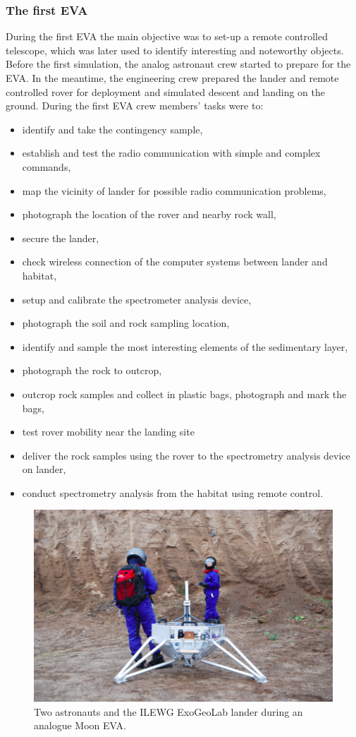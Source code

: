 \documentclass[preprint]{elsarticle}
\begin{document}
\subsubsection{The first EVA}
During the first EVA the main objective was to set-up a remote controlled telescope, which was later used to identify interesting and noteworthy objects. Before the first simulation, the analog astronaut crew started to prepare for the EVA. In the meantime, the engineering crew prepared the lander and remote controlled rover for deployment and simulated descent and landing on the ground. During the first EVA crew members' tasks were to:
\begin{itemize}
\item identify and take the contingency sample,
\item establish and test the radio communication with simple and complex commands,
\item map the vicinity of lander for possible radio communication problems,
\item photograph the location of the rover and nearby rock wall,
\item secure the lander,
\item check wireless connection of the computer systems between lander and habitat,
\item setup and calibrate the spectrometer analysis device,
\item photograph the soil and rock sampling location,
\item identify and sample the most interesting elements of the sedimentary layer,
\item photograph the rock to outcrop,
\item outcrop rock samples and collect in plastic bags, photograph and mark the bags,
\item test rover mobility near the landing site
\item deliver the rock samples using the rover to the spectrometry analysis device on lander,
\item conduct spectrometry analysis from the habitat using remote control.
\end{itemize}

\begin{figure}
\centering
\includegraphics{img/figure02.png}
\caption{Two astronauts and the ILEWG ExoGeoLab lander during an analogue Moon EVA.}
\label{fig:f02}
\end{figure}
\end{document}
